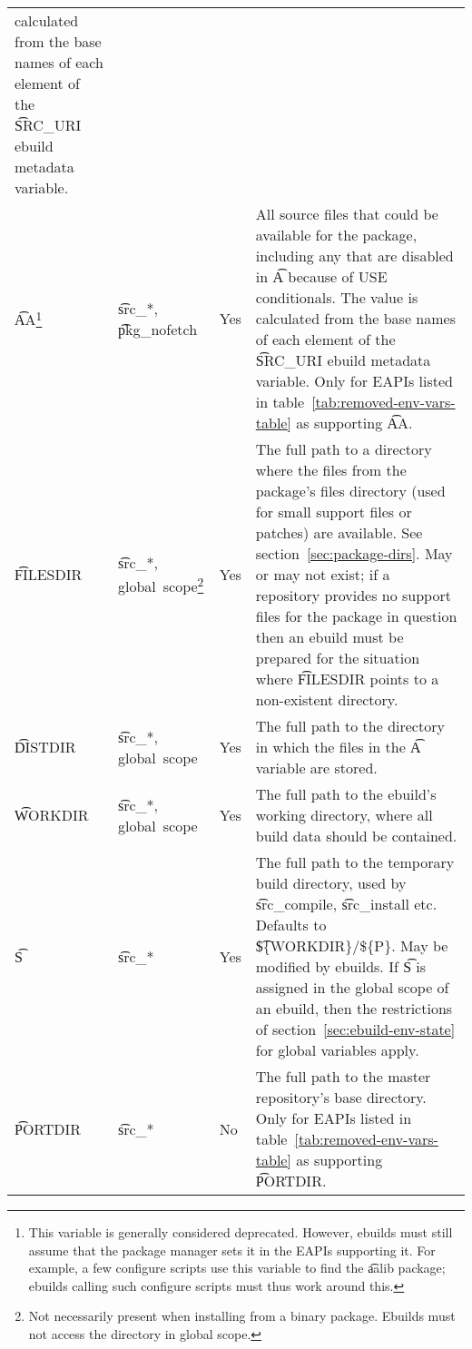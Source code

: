 \begin{landscape}
\begin{longtable}{!{\extracolsep{\fill}} l P{7.5em} l p{35em}}
    calculated from the base names of each element of the \t{SRC_URI} ebuild metadata variable. \\
\t{AA}\footnote{This variable is generally considered deprecated. However, ebuilds must still
    assume that the package manager sets it in the EAPIs supporting it. For example, a few
    configure scripts use this variable to find the \t{aalib} package; ebuilds calling such
    configure scripts must thus work around this.} &
    \t{src_*}, \t{pkg_nofetch} &
    Yes &
     All source files that could be available for the package, including any that
    are disabled in \t{A} because of USE conditionals. The value is calculated from the base names
    of each element of the \t{SRC_URI} ebuild metadata variable. Only for EAPIs listed in
    table~\ref{tab:removed-env-vars-table} as supporting \t{AA}. \\
\t{FILESDIR} &
    \t{src_*}, global~scope\footnote{Not necessarily present when installing from a binary package.
    Ebuilds must not access the directory in global scope.} &
    Yes &
    The full path to a directory where the files from the package's files directory (used for
    small support files or patches) are available. See section~\ref{sec:package-dirs}. May or may
    not exist; if a repository provides no support files for the package in question then an ebuild
    must be prepared for the situation where \t{FILESDIR} points to a non-existent directory. \\
\t{DISTDIR} &
    \t{src_*}, global~scope\footnotemark[\value{footnote}] &
    Yes &
    The full path to the directory in which the files in the \t{A} variable are stored. \\
\t{WORKDIR} &
    \t{src_*}, global~scope\footnotemark[\value{footnote}] &
    Yes &
    The full path to the ebuild's working directory, where all build data should be contained. \\
\t{S} &
    \t{src_*} &
    Yes &
    The full path to the temporary build directory, used by \t{src_compile}, \t{src_install} etc.
    Defaults to \t{\$\{WORKDIR\}/\$\{P\}}. May be modified by ebuilds. If \t{S} is assigned in the
    global scope of an ebuild, then the restrictions of section~\ref{sec:ebuild-env-state} for
    global variables apply. \\
\t{PORTDIR} &
    \t{src_*} &
    No &
     The full path to the master repository's base directory. Only for EAPIs
    listed in table~\ref{tab:removed-env-vars-table} as supporting \t{PORTDIR}. \\

\end{longtable}
\end{landscape}
